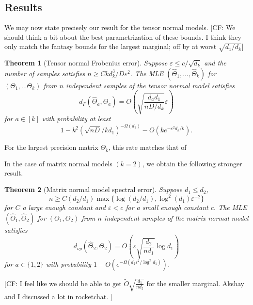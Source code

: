 \documentclass{article}
\newtheorem{theorem}{Theorem}
\newcommand{\R}{{\mathbb{R}}}
\newcommand{\ot}{\otimes}
\newcommand\eps{\varepsilon}
\newcommand\samp{x}
\newcommand{\CF}[1]{{\color{purple}[CF: #1]}}
\begin{document}





\subsection{Results}




We may now state precisely our result for the tensor normal models. \CF{We should think a bit about the best parametrization of these bounds. I think they only match the fantasy bounds for the largest marginal; off by at worst $\sqrt{d_1/d_k}$}
\begin{theorem}[Tensor normal Frobenius error]\label{thm:tensor-frobenius} Suppose $\eps \leq c/\sqrt{d_k}$ and the number of samples satisfies $n \geq C k d_k^3/D\eps^2$. The MLE $(\widehat{\Theta}_1, \dots, \widehat{\Theta}_k) $ for $(\Theta_1, \dots \Theta_k)$ from $n$ independent samples of the tensor normal model satisfies
$$ d_{F}(\widehat{\Theta}_a, \Theta_a) = O\left( \sqrt{\frac{d_a d_1}{n D/d_k}}\eps\right) $$
for $a \in [k]$ with probability at least 
$$1 - k^2 \left(\sqrt{nD} / kd_1 \right)^{ - \Omega(d_1)} - O(k e^{ - \eps^2 d_k / k}).$$
\end{theorem}
For the largest precision matrix $\Theta_k$, this rate matches that of 

 In the case of matrix normal models $(k=2)$, we obtain the following stronger result.

\begin{theorem}[Matrix normal model spectral error]\label{thm:matrix-normal} Suppose $d_1 \leq d_2$,
$$n \geq C (d_2/d_1) \max\{\log (d_2/d_1),  \log^2(d_1) \eps^{-2}\}$$ for $C$ a large enough constant and $\eps < c$ for a small enough constant $c$. The MLE $(\widehat{\Theta}_1,\widehat{\Theta}_2) $ for $(\Theta_1, \Theta_2)$ from $n$ independent samples of the matrix normal model satisfies
$$ d_{op}(\widehat{\Theta}_2, \Theta_2) = O\left(\eps \sqrt{\frac{d_2}{n d_1}} \log d_1\right) $$
for $a \in \{1,2\}$ with probability $1 - O(e^{ - \Omega( d_2 \eps^2/\log^2 d_1)})$.
\end{theorem}
\CF{I feel like we should be able to get $\tilde{O}\sqrt{\frac{d_1}{n d_2}}$ for the smaller marginal. Akshay and I discussed a lot in rocketchat. }
\end{document}
